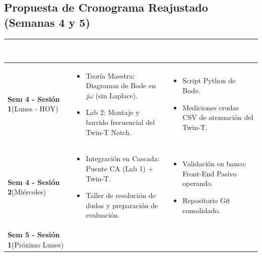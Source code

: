 \documentclass[11pt,a4paper,twoside]{article}
\begin{document}
\subsection*{Propuesta de Cronograma Reajustado (Semanas 4 y 5)}
\begin{table}[ht!]
    \centering
    \renewcommand{\arraystretch}{1.4}
    \begin{tabularx}{\textwidth}{|>{\raggedright\arraybackslash}p{3cm}|>{\raggedright\arraybackslash}X|>{\raggedright\arraybackslash}X|}
        \hline
        \rowcolor{ucbblue} \textcolor{white}{\textbf{Sesión}} & \textcolor{white}{\textbf{Contenido y Metodología}} & \textcolor{white}{\textbf{Entregable / Hito}} \\
        \hline
        \textbf{Sem 4 - Sesión 1}\newline (Lunes - HOY) & 
        \begin{itemize}[leftmargin=*, nosep]
            \item Teoría Maestra: Diagramas de Bode en $j\omega$ (sin Laplace).
            \item Lab 2: Montaje y barrido frecuencial del Twin-T Notch.
        \end{itemize} & 
        \begin{itemize}[leftmargin=*, nosep]
            \item Script Python de Bode.
            \item Mediciones crudas CSV de atenuación del Twin-T.
        \end{itemize} \\
        \hline
        \textbf{Sem 4 - Sesión 2}\newline (Miércoles) & 
        \begin{itemize}[leftmargin=*, nosep]
            \item Integración en Cascada: Puente CA (Lab 1) + Twin-T.
            \item Taller de resolución de dudas y preparación de evaluación.
        \end{itemize} & 
        \begin{itemize}[leftmargin=*, nosep]
            \item Validación en banco: Front-End Pasivo operando.
            \item Repositorio Git consolidado.
        \end{itemize} \\
        \hline
        \textbf{Sem 5 - Sesión 1}\newline (Próximo Lunes) & 
        \begin{itemize}[leftmargin=*, nosep]

\end{itemize}
\end{tabularx}
\end{table}
\end{document}
